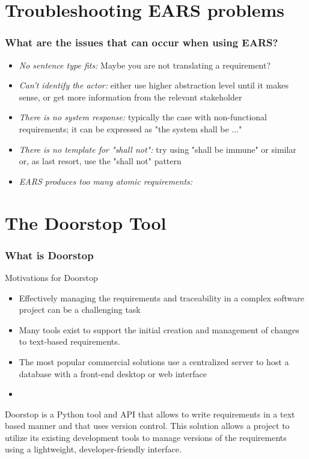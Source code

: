 \documentclass[aspectratio=169]{beamer}
\begin{document}
\section*{Troubleshooting EARS problems}

\begin{frame}
  \frametitle{What are the issues that can occur when using EARS?}
  \begin{itemize}
  \item {\it No sentence type fits:} Maybe you are not translating a requirement?
  \item {\it Can't identify the actor:} either use higher abstraction level until it makes sense, or get more information from the relevant stakeholder
  \item {\it There is no system response:}  typically the case with non-functional requirements; it can be expressed as "the system shall be ..."
  \item {\it There is no template for "shall not":} try using "shall be immune" or similar or, as last resort, use the "shall not" pattern
  \item {\it EARS produces too many atomic requirements:} 
  \end{itemize}
  
\end{frame}

\section*{The Doorstop Tool}


\begin{frame}
  \frametitle{What is Doorstop}
  \begin{block}{Motivations for Doorstop}
  \begin{itemize}
    \item Effectively managing the requirements and traceability in a complex software project can be a
challenging task
    \item Many tools exist to support the initial creation and management of changes to
text-based requirements.
    \item The most popular commercial solutions use a centralized server to host
a database with a front-end desktop or web interface
    \item {\bf }
  \end{itemize}
  
  \end{block}

  Doorstop is a Python tool and API that allows to write requirements in a text based manner and that uses version control. This solution allows a project to utilize its existing development tools to manage versions of the requirements using a lightweight, developer-friendly interface.  
\end{frame}
\end{document}
